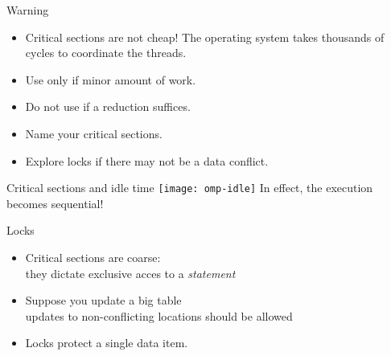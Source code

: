 \begin{numberedframe}{Warning}
  \begin{itemize}
  \item Critical sections are not cheap! The operating system takes
    thousands of cycles to coordinate the threads.
  \item Use only if minor amount of work.
  \item Do not use if a reduction suffices.
  \item Name your critical sections.
  \item Explore locks if there may not be a data conflict.
  \end{itemize}
\end{numberedframe}

\begin{numberedframe}{Critical sections and idle time}
    \texttt{[image: omp-idle]}
    In effect, the execution becomes sequential!
\end{numberedframe}

\begin{numberedframe}{Locks}
  \begin{itemize}
  \item Critical sections are coarse:\\
    they dictate exclusive acces to a \emph{statement}
  \item     Suppose you update a big table\\
    updates to non-conflicting locations should be allowed
  \item Locks protect a single data item.
  \end{itemize}
\end{numberedframe}

\endinput

\begin{numberedframe}{}
  \begin{itemize}
  \item 
  \end{itemize}
\end{numberedframe}

\endinput

\begin{numberedframe}{}
  \begin{itemize}
  \item 
  \end{itemize}
\end{numberedframe}

